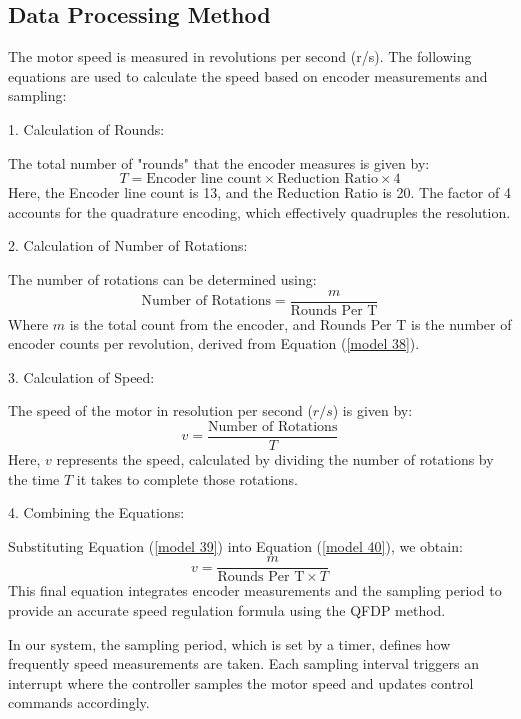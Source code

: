 \documentclass[journal,onecolumn]{IEEEtran}
\begin{document}
\subsection{Data Processing Method}

The motor speed is measured in revolutions per second (r/s). The following equations are used to calculate the speed based on encoder measurements and sampling:

1. Calculation of Rounds:

   The total number of "rounds" that the encoder measures is given by:
   \begin{equation}
       \label{model 37}
       T = \text{Encoder line count} \times \text{Reduction Ratio} \times 4
   \end{equation}
   Here, the Encoder line count is 13, and the Reduction Ratio is 20. The factor of 4 accounts for the quadrature encoding, which effectively quadruples the resolution.

2. Calculation of Number of Rotations:

   The number of rotations can be determined using:
   \begin{equation}
       \label{model 38}
       \text{Number of Rotations} = \frac{m}{\text{Rounds Per T}}
   \end{equation}
   Where \( m \) is the total count from the encoder, and Rounds Per T is the number of encoder counts per revolution, derived from Equation (\ref{model 38}).

3. Calculation of Speed:

   The speed of the motor in resolution per second (\( r/s \)) is given by:
   \begin{equation}
       \label{model 39}
       v = \frac{\text{Number of Rotations}}{T}
   \end{equation}
   Here, \( v \) represents the speed, calculated by dividing the number of rotations by the time \( T \) it takes to complete those rotations.

4. Combining the Equations:

   Substituting Equation (\ref{model 39}) into Equation (\ref{model 40}), we obtain:
   \begin{equation}
       \label{model 40}
       v = \frac{m}{\text{Rounds Per T} \times T}
   \end{equation}
   This final equation integrates encoder measurements and the sampling period to provide an accurate speed regulation formula using the QFDP method.

In our system, the sampling period, which is set by a timer, defines how frequently speed measurements are taken. Each sampling interval triggers an interrupt where the controller samples the motor speed and updates control commands accordingly.
\end{document}
